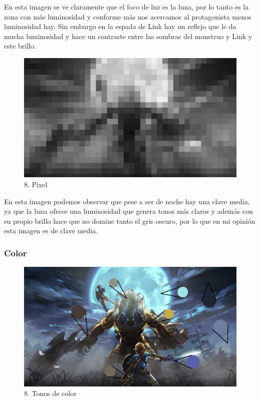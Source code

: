 \documentclass[12pt]{article}
\begin{document}
 En esta imagen se ve claramente que el foco de luz es la luna, por lo tanto es la zona con más luminosidad y conforme más nos acercamos al protagonista menos luminosidad hay. Sin embargo en la espada de Link hay un reflejo que le da mucha luminosidad y hace un contraste entre las sombras del monstruo y Link y este brillo.

\begin{figure}[H]
      \centering
      \includegraphics[width=\textwidth]{images/Raúl/Sección 8/Imagen 8 gris pixel.jpg}
      \caption{\small 8. Pixel}
    \end{figure}

 En esta imagen podemos observar que pese a ser de noche hay una clave media, ya que la luna ofrece una luminosidad que genera tonos más claros y además con su propio brillo hace que no domine tanto el gris oscuro, por lo que en mi opinión esta imagen es de clave media.

        \subsubsection{Color}

\begin{figure}[H]
      \centering
      \includegraphics[width=\textwidth]{images/Raúl/Sección 8/Imagen 8 tonos.jpg}
      \caption{\small 8. Tonos de color}
    \end{figure}
\end{document}
